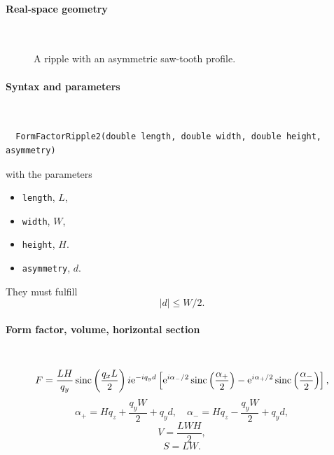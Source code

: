 \paragraph{Real-space geometry}\strut\\

\begin{figure}[H]
\hfill
{}
\hfill
{}
\hfill
{}
\hfill
\caption{A ripple with an asymmetric saw-tooth profile.}
\end{figure}

\FloatBarrier

\paragraph{Syntax and parameters}\strut\\[-2ex plus .2ex minus .2ex]
\begin{lstlisting}
  FormFactorRipple2(double length, double width, double height, asymmetry)
\end{lstlisting}
with the parameters
\begin{itemize}
\item \texttt{length}, $L$,
\item \texttt{width}, $W$,
\item \texttt{height}, $H$.
\item \texttt{asymmetry}, $d$.
\end{itemize}
They must fulfill
\begin{displaymath}
  |d| \le W/2.
\end{displaymath}

\paragraph{Form factor, volume, horizontal section}\strut\\
\begin{equation*}
  F = \frac{L H}{q_y}
  \operatorname{sinc}\left(\frac{q_xL}{2}\right)
  i\mathrm e^{-i q_y d}
  \left[
    \mathrm e^{i \alpha_{-}/2} \operatorname{sinc}\left( \frac{\alpha_{+}}{2} \right)
    - \mathrm e^{i \alpha_{+}/2} \operatorname{sinc}\left( \frac{\alpha_{-}}{2} \right)
  \right],
\end{equation*}
\begin{equation*}
  \alpha_{+} = H q_z + \frac{q_y W}{2} + q_y d, \quad
  \alpha_{-} = H q_z - \frac{q_y W}{2} + q_y d,
\end{equation*}
\begin{equation*}
  V = \dfrac{L W H}{2},
\end{equation*}
\begin{equation*}
  S = L W.
\end{equation*}

